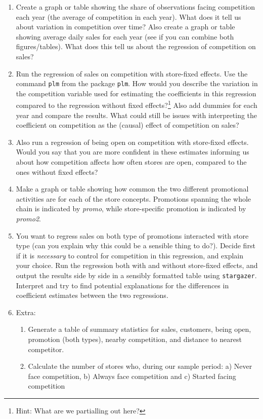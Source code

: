 \documentclass[12pt,a4paper]{article}
\begin{document}
\begin{enumerate}
\item Create a graph or table showing the share of observations facing competition each year (the average of competition in each year). What does it tell us about variation in competition over time? Also create a graph or table showing average daily sales for each year (see if you can combine both figures/tables). What does this tell us about the regression of competition on sales?
\item Run the regression of sales on competition with store-fixed effects. Use the command \texttt{plm} from the package \texttt{plm}. How would you describe the variation in the competition variable used for estimating the coefficients in this regression compared to the regression without fixed effects?\footnote{Hint: What are we partialling out here?} Also add dummies for each year and compare the results. What could still be issues with interpreting the coefficient on competition as the (causal) effect of competition on sales?
\item Also run a regression of being open on competition with store-fixed effects. Would you say that you are more confident in these estimates informing us about how competition affects how often stores are open, compared to the ones without fixed effects?
\item Make a graph or table showing how common the two different promotional activities are for each of the store concepts. Promotions spanning the whole chain is indicated by \emph{promo}, while store-specific promotion is indicated by \emph{promo2}.
\item You want to regress sales on both type of promotions interacted with store type (can you explain why this could be a sensible thing to do?). Decide first if it is \emph{necessary} to control for competition in this regression, and explain your choice. Run the regression both with and without store-fixed effects, and output the results side by side in a sensibly formatted table using \texttt{stargazer}. Interpret and try to find potential explanations for the differences in coefficient estimates between the two regressions.
\item Extra:
\begin{enumerate}
\item Generate a table of summary statistics for sales, customers, being open, promotion (both types), nearby competition, and distance to nearest competitor.
\item Calculate the number of stores who, during our sample period: a) Never face competition, b) Always face competition and c) Started facing competition

\end{enumerate}
\end{enumerate}
\end{document}
